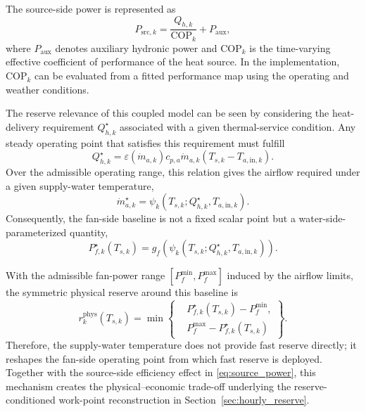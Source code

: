 \documentclass[journal]{IEEEtran}
\theoremstyle{remark}
\begin{document}
	The source-side power is represented as
	\begin{equation}
		P_{\mathrm{src},k}
		=
		\frac{Q_{h,k}}{\mathrm{COP}_k}
		+
		P_{\mathrm{aux}},
		\label{eq:source_power}
	\end{equation}
	where \(P_{\mathrm{aux}}\) denotes auxiliary hydronic power and \(\mathrm{COP}_k\) is the time-varying effective coefficient of performance of the heat source. In the implementation, \(\mathrm{COP}_k\) can be evaluated from a fitted performance map using the operating and weather conditions. 
	
	The reserve relevance of this coupled model can be seen by considering the heat-delivery requirement \(Q_{h,k}^{\star}\) associated with a given thermal-service condition. Any steady operating point that satisfies this requirement must fulfill
	\begin{equation}
		Q_{h,k}^{\star}
		=
		\varepsilon(\dot m_{a,k})
		c_{p,a}\dot m_{a,k}
		\left(T_{s,k}-T_{a,\mathrm{in},k}\right).
		\label{eq:equal_heat_requirement}
	\end{equation}
	Over the admissible operating range, this relation gives the airflow required under a given supply-water temperature,
	\begin{equation}
		\dot m_{a,k}^{\star}
		=
		\psi_k
		\left(
		T_{s,k};
		Q_{h,k}^{\star},T_{a,\mathrm{in},k}
		\right).
		\label{eq:airflow_family}
	\end{equation}
	Consequently, the fan-side baseline is not a fixed scalar point but a water-side-parameterized quantity,
	\begin{equation}
		P_{f,k}^{\star}(T_{s,k})
		=
		g_f
		\left(
		\psi_k
		\left(
		T_{s,k};Q_{h,k}^{\star},T_{a,\mathrm{in},k}
		\right)
		\right).
		\label{eq:fan_baseline_family}
	\end{equation}
	
	With the admissible fan-power range \([P_f^{\min},P_f^{\max}]\) induced by the airflow limits, the symmetric physical reserve around this baseline is
	\begin{equation}
		r_{k}^{\mathrm{phys}}(T_{s,k})
		=
		\min
		\left\{
		\begin{aligned}
			& P_{f,k}^{\star}(T_{s,k})-P_f^{\min},\\
			& P_f^{\max}-P_{f,k}^{\star}(T_{s,k})
		\end{aligned}
		\right\}.
		\label{eq:physical_reserve}
	\end{equation}
	Therefore, the supply-water temperature does not provide fast reserve directly; it reshapes the fan-side operating point from which fast reserve is deployed. Together with the source-side efficiency effect in \eqref{eq:source_power}, this mechanism creates the physical--economic trade-off underlying the reserve-conditioned work-point reconstruction in Section~\ref{sec:hourly_reserve}.
	
\end{document}
